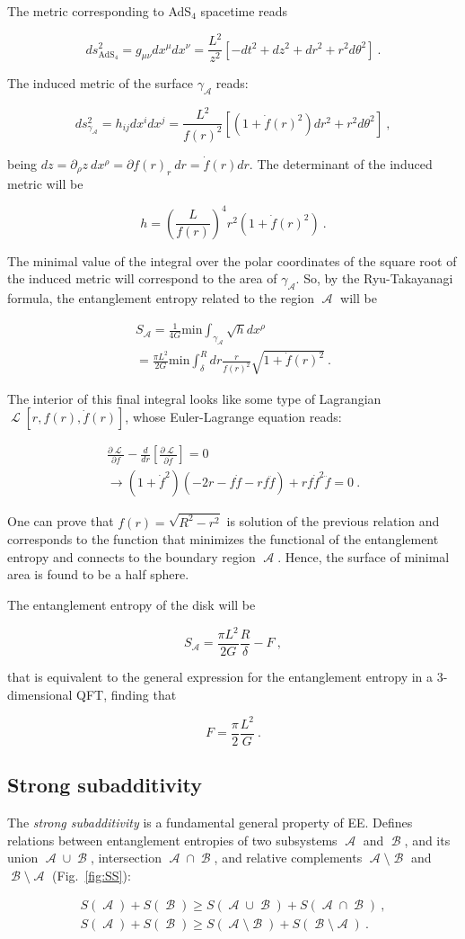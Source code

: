 \documentclass[twocolumn]{revtex4}
\providecommand{\eq}[2]{
    \begin{equation}
        #2
    \label{eq:#1}
    \end{equation}
}
\providecommand{\eqgat}[2]{
    \begin{gather}
        #2
    \label{eq:#1}
    \end{gather}
}
\DeclareMathOperator{\calA}{\mathcal{A}}
\DeclareMathOperator{\calB}{\mathcal{B}}
\DeclareMathOperator{\calL}{\mathcal{L}}
\begin{document}
The metric corresponding to AdS$_4$ spacetime reads
\eq{1Ametric}{
    ds^2_{\text{AdS}_4} = g_{\mu \nu} dx^\mu dx^\nu = 
    \frac{L^2}{z^2} [ -dt^2 + dz^2 + dr^2 + r^2 d\theta^2 ] \ .
}
The induced metric of the surface $\gamma_{\calA}$ reads:
\eq{1gammaAmetric}{
    ds^2_{\gamma_{\calA}} = h_{i j} dx^i dx^j = 
    \frac{L^2}{f(r)^2} \left[ \left( 1+ \dot{f}(r)^2 \right) dr^2 + r^2 d\theta^2 \right] \ ,
}
being $dz = \partial_\rho z \ dx^\rho = \partial f(r)_r \ dr = \dot{f}(r) dr$. The determinant of the induced metric will be
\eq{1h}{
    h = \left( \frac{L}{f(r)} \right) ^4 r^2 ( 1 + \dot{f}(r)^2 ) \ .
}
The minimal value of the integral over the polar coordinates of the square root of the induced metric will correspond to the area of $\gamma_{\calA}$. So, by the Ryu-Takayanagi formula, the entanglement entropy related to the region $\calA$ will be
\eqgat{1EEA}{
    S_{\calA} = \frac{1}{4G} \text{min} \int_{\gamma_{\calA}} \sqrt{h} dx^\rho \nonumber \\
    = \frac{\pi L^2}{2G} \text{min} \int_\delta^R dr \frac{r}{f(r)^2} \sqrt{ 1 + \dot{f}(r)^2 } \ .
}
The interior of this final integral looks like some type of Lagrangian $\calL [r,f(r),\dot{f}(r)]$, whose Euler-Lagrange equation reads:
\eqgat{1EL}{
    \frac{\partial \calL}{\partial f} - \frac{d}{dr} \left[ \frac{\partial \calL}{\partial \dot{f}} \right] = 0 \nonumber \\
    \longrightarrow \left( 1+\dot{f}^2 \right) \left( -2r-f\dot{f}-rf\ddot{f} \right) + rf\dot{f}^2\ddot{f} = 0 \ .
}
One can prove that $f(r) = \sqrt{R^2 - r^2}$ is solution of the previous relation and corresponds to the function that minimizes the functional of the entanglement entropy and connects to the boundary region $\calA$. Hence, the surface of minimal area is found to be a half sphere.

The entanglement entropy of the disk will be
\eq{1sol}{
    S_{\calA} = \frac{\pi L^2}{2G} \frac{R}{\delta} - F \ ,
}
that is equivalent to the general expression for the entanglement entropy in a 3-dimensional QFT, finding that
\eq{F}{
    F = \frac{\pi}{2} \frac{L^2}{G} \ .
}


\subsection{Strong subadditivity} \label{ss:SS}

The \textit{strong subadditivity} \cite{headrick_holographic_2007} is a fundamental general property of EE. Defines relations between entanglement entropies of two subsystems $\calA$ and $\calB$, and its union $\calA \cup \calB$, intersection $\calA \cap \calB$, and relative complements $\calA \setminus \calB$ and $\calB \setminus \calA$ (Fig.~\ref{fig:SS}):
\eqgat{EE_strong-subadd}{
    S(\calA) + S(\calB) \ge S(\calA \cup \calB) + S(\calA \cap \calB) \ , \nonumber \\
    S(\calA) + S(\calB) \ge S(\calA \setminus \calB) + S(\calB \setminus \calA) \ .
}
\end{document}

